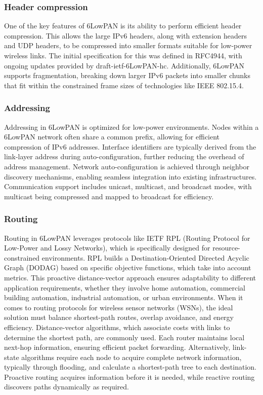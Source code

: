 \subsubsection{Header compression}
One of the key features of 6LowPAN is its ability to perform efficient header compression.
This allows the large IPv6 headers, along with extension headers and UDP headers, to be compressed into smaller formats suitable for low-power wireless links. 
The initial specification for this was defined in RFC4944, with ongoing updates provided by draft-ietf-6LowPAN-hc. 
Additionally, 6LowPAN supports fragmentation, breaking down larger IPv6 packets into smaller chunks that fit within the constrained frame sizes of technologies like IEEE 802.15.4. 

\subsubsection{Addressing}
Addressing in 6LowPAN is optimized for low-power environments.
Nodes within a 6LowPAN network often share a common prefix, allowing for efficient compression of IPv6 addresses. 
Interface identifiers are typically derived from the link-layer address during auto-configuration, further reducing the overhead of address management. 
Network auto-configuration is achieved through neighbor discovery mechanisms, enabling seamless integration into existing infrastructures. 
Communication support includes unicast, multicast, and broadcast modes, with multicast being compressed and mapped to broadcast for efficiency.

\subsubsection{Routing}
Routing in 6LowPAN leverages protocols like IETF RPL (Routing Protocol for Low-Power and Lossy Networks), which is specifically designed for resource-constrained environments. 
RPL builds a Destination-Oriented Directed Acyclic Graph (DODAG) based on specific objective functions, which take into account metrics.
This proactive distance-vector approach ensures adaptability to different application requirements, whether they involve home automation, commercial building automation, industrial automation, or urban environments.
When it comes to routing protocols for wireless sensor networks (WSNs), the ideal solution must balance shortest-path routes, overlap avoidance, and energy efficiency. 
Distance-vector algorithms, which associate costs with links to determine the shortest path, are commonly used. Each router maintains local next-hop information, ensuring efficient packet forwarding.
Alternatively, link-state algorithms require each node to acquire complete network information, typically through flooding, and calculate a shortest-path tree to each destination. 
Proactive routing acquires information before it is needed, while reactive routing discovers paths dynamically as required.

